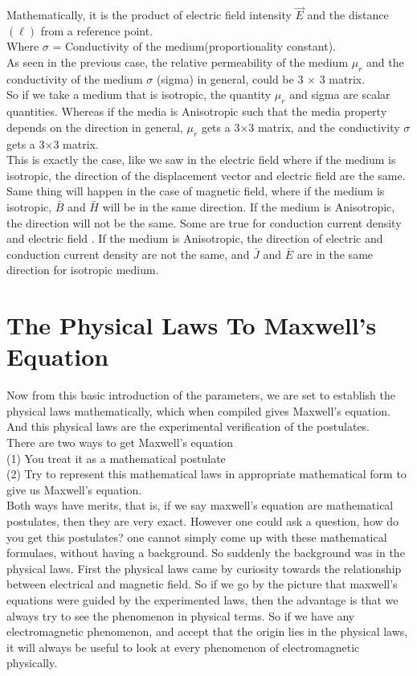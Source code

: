 Mathematically, it is the product of electric field intensity $\vec{E}$ and the distance$(\ell)$ from a reference point.\\

Where $\sigma$ = Conductivity of the medium(proportionality constant).\\

As seen in the previous case, the relative permeability of the medium $ \mu_r $ and the conductivity of the medium $ \sigma $ (sigma) in general, could be 3 $ \times $ 3 matrix.\\
So if we take a medium that is isotropic, the quantity $ \mu_r$ and sigma are scalar quantities. Whereas if the media is Anisotropic such that the media property depends on the direction in general, $ \mu_r $ gets a 3$ \times $3 matrix,  and the conductivity $ \sigma $ gets a 3$ \times $3 matrix. \\

This is exactly the case, like we saw in the electric field where if the medium is isotropic, the direction of the displacement vector and electric field are the same. Same thing will happen in the case of magnetic field, where if the medium is isotropic, $ \bar{B}$ and $ \bar{H}$ will be in the same direction. If the medium is Anisotropic, the direction will not be the same. Some are true for conduction current density and electric field . If the medium is Anisotropic, the direction of electric and conduction current density are not the same, and $ \bar{J} $ and $\bar{E}$ are in the same direction  for isotropic medium. \\

\section{The Physical Laws To Maxwell's Equation}
Now from this basic introduction of the parameters, we are set to establish the physical laws mathematically, which when compiled gives Maxwell's equation. And this physical laws are the experimental verification of the postulates.\\
There are two ways to get Maxwell's equation \\
(1)	You treat it as a mathematical postulate\\
(2)	Try to represent this mathematical laws in appropriate mathematical form to give us Maxwell's equation.\\

Both ways have merits, that is, if we say maxwell's equation are mathematical postulates, then they are very exact. However one could ask a question, how do you get this postulates? one cannot simply come up with these mathematical formulaes, without having a background. So suddenly the background was in the physical laws. First the physical laws came by curiosity towards the relationship between electrical and magnetic field. So if we go by the picture that maxwell's equations were guided by the experimented laws, then the advantage is that we always try to see the phenomenon in physical terms. So if we have any electromagnetic phenomenon, and accept that the origin lies in the physical laws, it will always be useful to look at every phenomenon of electromagnetic physically.\\

